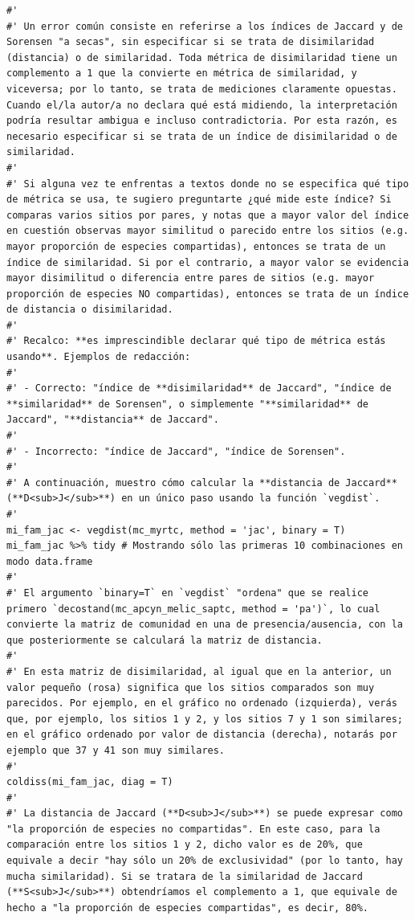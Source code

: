 \documentclass[11pt,]{article}
\begin{document}
\begin{verbatim}
#' 
#' Un error común consiste en referirse a los índices de Jaccard y de Sorensen "a secas", sin especificar si se trata de disimilaridad (distancia) o de similaridad. Toda métrica de disimilaridad tiene un complemento a 1 que la convierte en métrica de similaridad, y viceversa; por lo tanto, se trata de mediciones claramente opuestas. Cuando el/la autor/a no declara qué está midiendo, la interpretación podría resultar ambigua e incluso contradictoria. Por esta razón, es necesario especificar si se trata de un índice de disimilaridad o de similaridad.
#' 
#' Si alguna vez te enfrentas a textos donde no se especifica qué tipo de métrica se usa, te sugiero preguntarte ¿qué mide este índice? Si comparas varios sitios por pares, y notas que a mayor valor del índice en cuestión observas mayor similitud o parecido entre los sitios (e.g. mayor proporción de especies compartidas), entonces se trata de un índice de similaridad. Si por el contrario, a mayor valor se evidencia mayor disimilitud o diferencia entre pares de sitios (e.g. mayor proporción de especies NO compartidas), entonces se trata de un índice de distancia o disimilaridad.
#' 
#' Recalco: **es imprescindible declarar qué tipo de métrica estás usando**. Ejemplos de redacción:
#' 
#' - Correcto: "índice de **disimilaridad** de Jaccard", "índice de **similaridad** de Sorensen", o simplemente "**similaridad** de Jaccard", "**distancia** de Jaccard".
#' 
#' - Incorrecto: "índice de Jaccard", "índice de Sorensen".
#' 
#' A continuación, muestro cómo calcular la **distancia de Jaccard** (**D<sub>J</sub>**) en un único paso usando la función `vegdist`.
#' 
mi_fam_jac <- vegdist(mc_myrtc, method = 'jac', binary = T)
mi_fam_jac %>% tidy # Mostrando sólo las primeras 10 combinaciones en modo data.frame
#' 
#' El argumento `binary=T` en `vegdist` "ordena" que se realice primero `decostand(mc_apcyn_melic_saptc, method = 'pa')`, lo cual convierte la matriz de comunidad en una de presencia/ausencia, con la que posteriormente se calculará la matriz de distancia.
#' 
#' En esta matriz de disimilaridad, al igual que en la anterior, un valor pequeño (rosa) significa que los sitios comparados son muy parecidos. Por ejemplo, en el gráfico no ordenado (izquierda), verás que, por ejemplo, los sitios 1 y 2, y los sitios 7 y 1 son similares; en el gráfico ordenado por valor de distancia (derecha), notarás por ejemplo que 37 y 41 son muy similares.
#'  
coldiss(mi_fam_jac, diag = T)
#' 
#' La distancia de Jaccard (**D<sub>J</sub>**) se puede expresar como "la proporción de especies no compartidas". En este caso, para la comparación entre los sitios 1 y 2, dicho valor es de 20%, que equivale a decir "hay sólo un 20% de exclusividad" (por lo tanto, hay mucha similaridad). Si se tratara de la similaridad de Jaccard (**S<sub>J</sub>**) obtendríamos el complemento a 1, que equivale de hecho a "la proporción de especies compartidas", es decir, 80%.

\end{verbatim}
\end{document}
